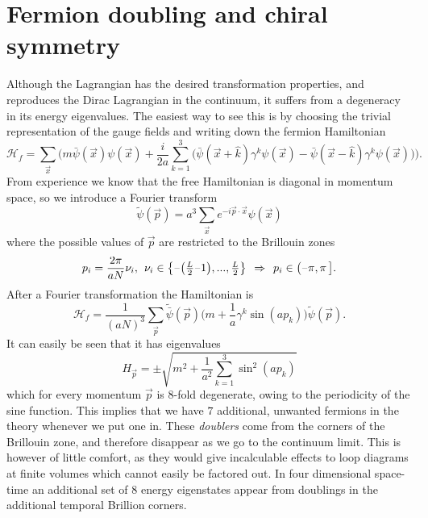 \section{Fermion doubling and chiral symmetry} \label{sec:fermion_doubling}

Although the Lagrangian  has the desired
transformation properties, and reproduces the Dirac Lagrangian in the continuum, it
suffers from a degeneracy in its energy eigenvalues. The easiest way to see this
is by choosing the trivial representation of the gauge fields and writing down
the fermion Hamiltonian
%
\begin{equation}
  \mathcal{H}_f = \sum_{\vec{x}} \bigg(
    m \bar{\psi}(\vec{x}) \psi(\vec{x}) + \frac{i}{2a} \sum_{k=1}^3 \Big(
      \bar{\psi}(\vec{x}+\hat{k})\gamma^k\psi(\vec{x}) 
      -\bar{\psi}(\vec{x}-\hat{k})\gamma^k\psi(\vec{x})\Big)\bigg).
\end{equation}
%
From experience we know that the free Hamiltonian is diagonal in momentum space,
so we introduce a Fourier transform
%
\begin{equation}
  \tilde{\psi}(\vec{p}) = a^3 \sum_{\vec{x}} e^{-i \vec{p}\cdot \vec{x}}
    \psi(\vec{x})
\end{equation}
%
where the possible values of $\vec{p}$ are restricted to the Brillouin zones
%
\begin{equation}
  p_i = \frac{2\pi}{a N} \nu_i, \hskip1ex \nu_i \in
    \big\{\textstyle\minus{}\big(\frac{L}{2}\minus{}1\big), ...,
    \frac{L}{2} \big\} \hskip1ex\Rightarrow\hskip1ex p_i \in \big(\minus\pi, \pi\,\big].
\end{equation}
%
After a Fourier transformation the Hamiltonian is
%
\begin{equation}
  \mathcal{H}_f = \frac{1}{(aN)^3}\sum_{\vec{p}} \tilde{\bar{\psi}}(\vec{p})
    \Big( m + \frac{1}{a} \gamma^k \sin (a p_k) \Big) \tilde{\psi}(\vec{p}).
\end{equation}
%
It can easily be seen that it has eigenvalues
%
\begin{equation}
  H_{\vec{p}} = \pm \sqrt{m^2 + \frac{1}{a^2} \sum_{k=1}^3 \sin^2 (a p_k)}
\end{equation}
%
which for every momentum $\vec{p}$ is $8$-fold degenerate, owing to the
periodicity of the sine function. This implies that we have $7$ additional,
unwanted fermions in the theory whenever we put one in. These \emph{doublers}
come from the corners of the Brillouin zone, and therefore disappear as we go
to the continuum limit. This is however of little comfort, as they would give
incalculable effects to loop diagrams at finite volumes which cannot easily be
factored out. In four dimensional space-time an additional set of $8$ energy
eigenstates appear from doublings in the additional temporal Brillion corners.

